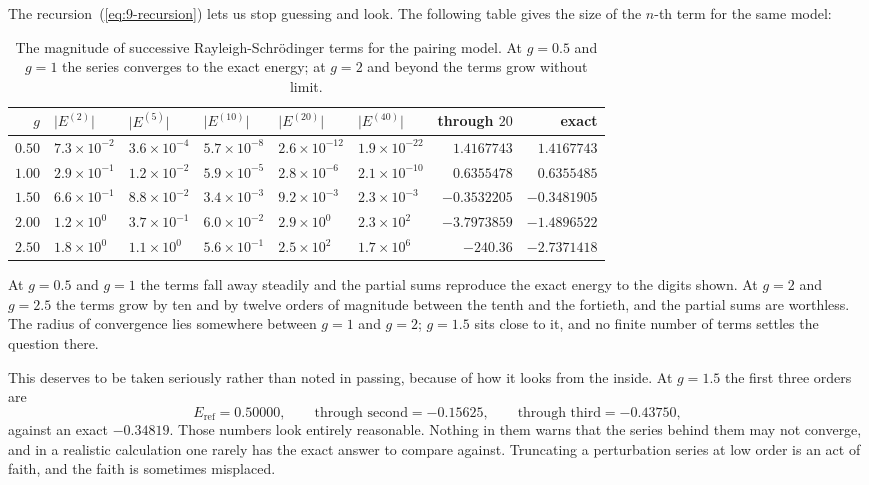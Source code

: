 The recursion~(\ref{eq:9-recursion}) lets us stop guessing and look.  The
following table gives the size of the $n$-th term for the same model:

\begin{table}[h]
\centering
\renewcommand{\arraystretch}{1.25}
\setlength{\tabcolsep}{6pt}
\small
\begin{tabular}{rlllllrr}
\toprule
$g$ & $\vert E^{(2)}\vert$ & $\vert E^{(5)}\vert$
  & $\vert E^{(10)}\vert$ & $\vert E^{(20)}\vert$
  & $\vert E^{(40)}\vert$ & through $20$ & exact\\
\midrule
$0.50$ & $7.3\times10^{-2}$ & $3.6\times10^{-4}$ & $5.7\times10^{-8}$
  & $2.6\times10^{-12}$ & $1.9\times10^{-22}$ & $1.4167743$ & $1.4167743$\\
$1.00$ & $2.9\times10^{-1}$ & $1.2\times10^{-2}$ & $5.9\times10^{-5}$
  & $2.8\times10^{-6}$ & $2.1\times10^{-10}$ & $0.6355478$ & $0.6355485$\\
$1.50$ & $6.6\times10^{-1}$ & $8.8\times10^{-2}$ & $3.4\times10^{-3}$
  & $9.2\times10^{-3}$ & $2.3\times10^{-3}$ & $-0.3532205$ & $-0.3481905$\\
$2.00$ & $1.2\times10^{0}$ & $3.7\times10^{-1}$ & $6.0\times10^{-2}$
  & $2.9\times10^{0}$ & $2.3\times10^{2}$ & $-3.7973859$ & $-1.4896522$\\
$2.50$ & $1.8\times10^{0}$ & $1.1\times10^{0}$ & $5.6\times10^{-1}$
  & $2.5\times10^{2}$ & $1.7\times10^{6}$ & $-240.36$ & $-2.7371418$\\
\bottomrule
\end{tabular}
\caption{The magnitude of successive Rayleigh-Schr\"odinger terms for the
pairing model.  At $g=0.5$ and $g=1$ the series converges to the exact
energy; at $g=2$ and beyond the terms grow without limit.}
\label{tab:convergence}
\end{table}

At $g=0.5$ and $g=1$ the terms fall away steadily and the partial sums
reproduce the exact energy to the digits shown.  At $g=2$ and $g=2.5$ the
terms grow by ten and by twelve orders of magnitude between the tenth and the
fortieth, and the partial sums are worthless.  The radius of convergence lies
somewhere between $g=1$ and $g=2$; $g=1.5$ sits close to it, and no finite
number of terms settles the question there.

This deserves to be taken seriously rather than noted in passing, because of
how it looks from the inside.  At $g=1.5$ the first three orders are
\begin{equation}
  E_{\mathrm{ref}} = 0.50000,
  \qquad
  \text{through second} = -0.15625,
  \qquad
  \text{through third} = -0.43750,
  \label{eq:9-innocuous}
\end{equation}
against an exact $-0.34819$.  Those numbers look entirely reasonable.
Nothing in them warns that the series behind them may not converge, and in a
realistic calculation one rarely has the exact answer to compare against.
Truncating a perturbation series at low order is an act of faith, and the
faith is sometimes misplaced.


